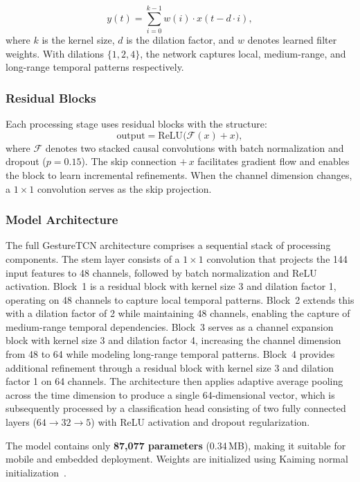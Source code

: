 \begin{equation}
  y(t) = \sum_{i=0}^{k-1} w(i) \cdot x(t - d \cdot i),
  \label{eq:dilated_conv}
\end{equation}
where $k$ is the kernel size, $d$ is the dilation factor, and $w$
denotes learned filter weights. With dilations $\{1, 2, 4\}$, the
network captures local, medium-range, and long-range temporal patterns
respectively.

\subsubsection{Residual Blocks}

Each processing stage uses residual blocks with the structure:
\[
  \text{output} = \text{ReLU}\!\bigl(\mathcal{F}(x) + x\bigr),
\]
where $\mathcal{F}$ denotes two stacked causal convolutions with batch
normalization and dropout ($p=0.15$). The skip connection $+\,x$
facilitates gradient flow and enables the block to learn incremental
refinements. When the channel dimension changes, a $1\!\times\!1$
convolution serves as the skip projection.

\subsubsection{Model Architecture}

The full GestureTCN architecture comprises a sequential stack of processing components. The stem layer consists of a $1\!\times\!1$ convolution that projects the 144 input features to 48 channels, followed by batch normalization and ReLU activation. Block~1 is a residual block with kernel size 3 and dilation factor 1, operating on 48 channels to capture local temporal patterns. Block~2 extends this with a dilation factor of 2 while maintaining 48 channels, enabling the capture of medium-range temporal dependencies. Block~3 serves as a channel expansion block with kernel size 3 and dilation factor 4, increasing the channel dimension from 48 to 64 while modeling long-range temporal patterns. Block~4 provides additional refinement through a residual block with kernel size 3 and dilation factor 1 on 64 channels. The architecture then applies adaptive average pooling across the time dimension to produce a single 64-dimensional vector, which is subsequently processed by a classification head consisting of two fully connected layers ($64 \to 32 \to 5$) with ReLU activation and dropout regularization.

The model contains only \textbf{87,077 parameters} (0.34\,MB),
making it suitable for mobile and embedded deployment. Weights are
initialized using Kaiming normal initialization~\cite{he2015delving}.

